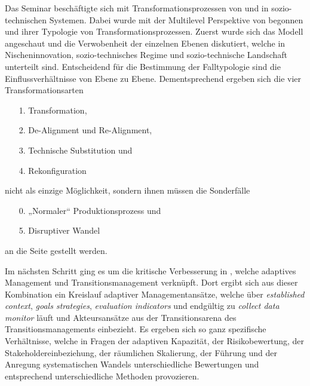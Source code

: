 \documentclass[11pt,a4paper]{article}
\begin{document}
Das Seminar beschäftigte sich mit Transformationsprozessen von und in
sozio-technischen Systemen. Dabei wurde mit der Multilevel Perspektive von
\cite{Geels2007} begonnen und ihrer Typologie von Transformationsprozessen.
Zuerst wurde sich das Modell angeschaut und die Verwobenheit der einzelnen
Ebenen diskutiert, welche in Nischeninnovation, sozio-technisches Regime und
sozio-technische Landschaft unterteilt sind. Entscheidend für die Bestimmung
der Falltypologie sind die Einflussverhältnisse von Ebene zu Ebene.
Dementsprechend ergeben sich die vier Transformationsarten
\begin{itemize}[noitemsep]
\item[1.] Transformation,
\item[2.] De-Alignment und Re-Alignment,
\item[3.] Technische Substitution und
\item[4.] Rekonfiguration
\end{itemize}
nicht als einzige Möglichkeit, sondern ihnen müssen die Sonderfälle
\begin{enumerate}[noitemsep]
\item[0.] „Normaler“ Produktionsprozess und 
\item[5.] Disruptiver Wandel
\end{enumerate}
an die Seite gestellt werden.

Im nächsten Schritt ging es um die kritische Verbesserung in \cite{Foxon2009},
welche adaptives Management und Transitionsmanagement verknüpft. Dort ergibt
sich aus dieser Kombination ein Kreislauf adaptiver Managementansätze, welche
über \emph{established context}, \emph{goals strategies}, \emph{evaluation
  indicators} und endgültig zu \emph{collect data monitor} läuft und
Akteursansätze aus der Transitionsarena des Transitionsmanagements
einbezieht. Es ergeben sich so ganz spezifische Verhältnisse, welche in Fragen
der adaptiven Kapazität, der Risikobewertung, der Stakeholdereinbeziehung, der
räumlichen Skalierung, der Führung und der Anregung systematischen Wandels
unterschiedliche Bewertungen und entsprechend unterschiedliche Methoden
provozieren.
\end{document}
